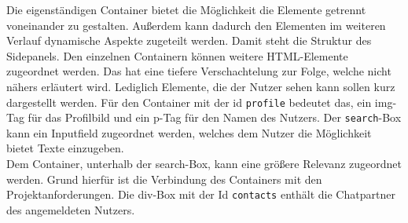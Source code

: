 \documentclass[a4paper,titlepage,halfparskip,12pt]{scrreprt}
\begin{document}
\begin{onehalfspacing}
Die eigenständigen Container bietet die Möglichkeit die Elemente getrennt voneinander zu gestalten. Außerdem kann dadurch den Elementen im weiteren Verlauf dynamische Aspekte zugeteilt werden. Damit steht die Struktur des Sidepanels. Den einzelnen Containern können weitere HTML-Elemente zugeordnet werden. Das hat eine tiefere Verschachtelung zur Folge, welche nicht nähers erläutert wird. Lediglich Elemente, die der Nutzer sehen kann sollen kurz dargestellt werden. Für den Container mit der id \texttt{profile} bedeutet das, ein img-Tag für das Profilbild und ein p-Tag für den Namen des Nutzers.
Der \texttt{search}-Box kann ein Inputfield zugeordnet werden, welches dem Nutzer die Möglichkeit bietet Texte einzugeben. \cite{bootstrapOnline}\\
Dem Container, unterhalb der search-Box, kann eine größere Relevanz zugeordnet werden. Grund hierfür ist die Verbindung des Containers mit den Projektanforderungen. Die div-Box mit der Id \texttt{contacts} enthält die Chatpartner des angemeldeten Nutzers.

\pagebreak


\end{onehalfspacing}
\end{document}
